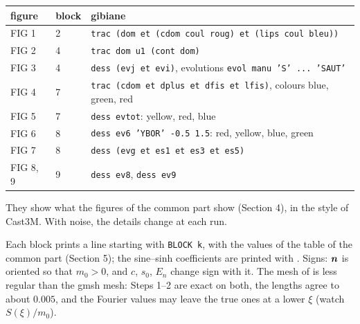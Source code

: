 \begin{center}\small
\begin{tabular}{>{\sffamily}l l l}
\toprule
figure & block & gibiane\\
\midrule
FIG 1 & 2 & \texttt{trac (dom et (cdom coul roug) et (lips coul bleu))}\\
FIG 2 & 4 & \texttt{trac dom u1 (cont dom)}\\
FIG 3 & 4 & \texttt{dess (evj et evi)}, evolutions \texttt{evol manu 'S' ... 'SAUT'}\\
FIG 4 & 7 & \texttt{trac (cdom et dplus et dfis et lfis)}, colours blue, green, red\\
FIG 5 & 7 & \texttt{dess evtot}: yellow, red, blue\\
FIG 6 & 8 & \texttt{dess ev6 'YBOR' -0.5 1.5}: red, yellow, blue, green\\
FIG 7 & 8 & \texttt{dess (evg et es1 et es3 et es5)}\\
FIG 8, 9 & 9 & \texttt{dess ev8}, \texttt{dess ev9}\\
\bottomrule
\end{tabular}
\end{center}
They show what the figures of the common part show (Section 4), in the
style of Cast3M. With noise, the details change at each run.

Each block prints a line starting with \texttt{BLOCK k}, with the values of
the table of the common part (Section 5); the sine--sinh coefficients are
printed with . Signs: $\bm{n}$ is oriented so that $m_0>0$, and $c$,
$s_0$, $E_n$ change sign with it. The mesh of  is less regular than
the gmsh mesh: Steps 1--2 are exact on both, the lengths agree to about
$0.005$, and the Fourier values may leave the true ones at a lower $\xi$
(watch $S(\xi)/m_0$).

